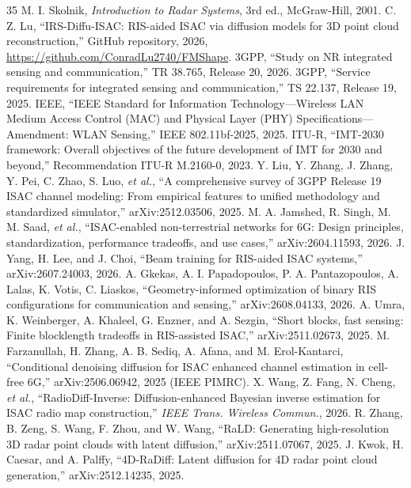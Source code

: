 \documentclass[11pt]{article}
\begin{document}
\begin{thebibliography}{35}
 M. I. Skolnik, \emph{Introduction to Radar Systems}, 3rd ed., McGraw-Hill, 2001.
 C. Z. Lu, ``IRS-Diffu-ISAC: RIS-aided ISAC via diffusion models for 3D point cloud reconstruction,'' GitHub repository, 2026, \url{https://github.com/ConradLu2740/FMShape}.
 3GPP, ``Study on NR integrated sensing and communication,'' TR 38.765, Release 20, 2026.
 3GPP, ``Service requirements for integrated sensing and communication,'' TS 22.137, Release 19, 2025.
 IEEE, ``IEEE Standard for Information Technology---Wireless LAN Medium Access Control (MAC) and Physical Layer (PHY) Specifications---Amendment: WLAN Sensing,'' IEEE 802.11bf-2025, 2025.
 ITU-R, ``IMT-2030 framework: Overall objectives of the future development of IMT for 2030 and beyond,'' Recommendation ITU-R M.2160-0, 2023.
 Y. Liu, Y. Zhang, J. Zhang, Y. Pei, C. Zhao, S. Luo, \emph{et al.}, ``A comprehensive survey of 3GPP Release 19 ISAC channel modeling: From empirical features to unified methodology and standardized simulator,'' arXiv:2512.03506, 2025.
 M. A. Jamshed, R. Singh, M. M. Saad, \emph{et al.}, ``ISAC-enabled non-terrestrial networks for 6G: Design principles, standardization, performance tradeoffs, and use cases,'' arXiv:2604.11593, 2026.
 J. Yang, H. Lee, and J. Choi, ``Beam training for RIS-aided ISAC systems,'' arXiv:2607.24003, 2026.
 A. Gkekas, A. I. Papadopoulos, P. A. Pantazopoulos, A. Lalas, K. Votis, C. Liaskos, ``Geometry-informed optimization of binary RIS configurations for communication and sensing,'' arXiv:2608.04133, 2026.
 A. Umra, K. Weinberger, A. Khaleel, G. Enzner, and A. Sezgin, ``Short blocks, fast sensing: Finite blocklength tradeoffs in RIS-assisted ISAC,'' arXiv:2511.02673, 2025.
 M. Farzanullah, H. Zhang, A. B. Sediq, A. Afana, and M. Erol-Kantarci, ``Conditional denoising diffusion for ISAC enhanced channel estimation in cell-free 6G,'' arXiv:2506.06942, 2025 (IEEE PIMRC).
 X. Wang, Z. Fang, N. Cheng, \emph{et al.}, ``RadioDiff-Inverse: Diffusion-enhanced Bayesian inverse estimation for ISAC radio map construction,'' \emph{IEEE Trans. Wireless Commun.}, 2026.
 R. Zhang, B. Zeng, S. Wang, F. Zhou, and W. Wang, ``RaLD: Generating high-resolution 3D radar point clouds with latent diffusion,'' arXiv:2511.07067, 2025.
 J. Kwok, H. Caesar, and A. Palffy, ``4D-RaDiff: Latent diffusion for 4D radar point cloud generation,'' arXiv:2512.14235, 2025.

\end{thebibliography}
\end{document}
